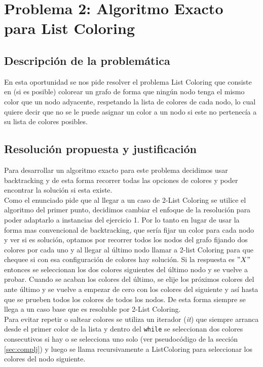 \newpage
\section{Problema 2: Algoritmo Exacto para List Coloring}

\subsection{Descripción de la problemática}
En esta oportunidad se nos pide resolver el problema List Coloring que consiste en (si es posible) colorear un grafo de forma que ningún nodo tenga el mismo color que un nodo adyacente, respetando la lista de colores de cada nodo, lo cual quiere decir que no se le puede asignar un color a un nodo si este no pertenecía a su lista de colores posibles.

\subsection{Resolución propuesta y justificación}

Para desarrollar un algoritmo exacto para este problema decidimos usar backtracking y de esta forma recorrer todas las opciones de colores y poder encontrar la solución si esta existe.\\

Como el enunciado pide que al llegar a un caso de 2-List Coloring se utilice el algoritmo del primer punto, decidimos cambiar el enfoque de la resolución para poder adaptarlo a instancias del ejercicio 1. Por lo tanto en lugar de usar la forma mas convencional de backtracking, que sería fijar un color para cada nodo y ver si es solución, optamos por recorrer todos los nodos del grafo fijando dos colores por cada uno y al llegar al último nodo llamar a 2-list Coloring para que chequee si con esa configuración de colores hay solución. Si la respuesta es $"X"$ entonces se seleccionan los dos colores siguientes del último nodo y se vuelve a probar. Cuando se acaban los colores del último, se elije los próximos colores del ante último y se vuelve a empezar de cero con los colores del siguiente y así hasta que se prueben todos los colores de todos los nodos. De esta forma siempre se llega a un caso base que es resoluble por 2-List Coloring.\\

Para evitar repetir o saltear colores se utiliza un iterador (\emph{it}) que siempre arranca desde el primer color de la lista y dentro del \texttt{while} se seleccionan dos colores consecutivos si hay o se selecciona uno solo (ver pseudocódigo de la sección \ref{sec:complj}) y luego se llama recursivamente a ListColoring para seleccionar los colores del nodo siguiente.\\


